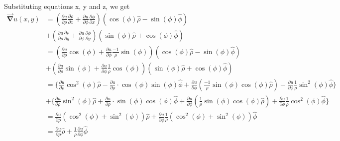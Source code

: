 \documentclass[11pt]{article}
\begin{document}
Substituting equations x, y and z, we get \begin{equation}
\begin{split}
\vec{\mathbf{\nabla}} u(x,y) & = 
\left( \frac {\partial u}{\partial \rho}\frac {\partial \rho}{\partial x} + \frac {\partial u}{\partial \phi}\frac {\partial \phi}{\partial x} \right) \left( \cos(\phi) \hat{\rho} - \sin(\phi) \hat{\phi} \right) \\ & + \left(\frac {\partial u}{\partial \rho}\frac {\partial \rho}{\partial y} + \frac {\partial u}{\partial \phi}\frac {\partial \phi}{\partial y} \right)  \left( \sin(\phi) \hat{\rho} + \cos(\phi) \hat{\phi} \right) 
\\ & =
\left( \frac {\partial u}{\partial \rho} \cos(\phi) + \frac {\partial u}{\partial \phi}\frac {-1}{\rho} \sin(\phi) \right) \left( \cos(\phi) \hat{\rho} - \sin(\phi) \hat{\phi} \right) \\ & + \left(\frac {\partial u}{\partial \rho}\sin(\phi) + \frac {\partial u}{\partial \phi}\frac {1}{\rho} \cos(\phi) \right)  \left( \sin(\phi) \hat{\rho} + \cos(\phi) \hat{\phi} \right)
\\ & = 
\Bigg\{ \frac {\partial u}{\partial \rho} \cos^{2}(\phi)\hat{\rho} - \frac {\partial u}{\partial \rho}\cdot \cos(\phi)\sin(\phi) \hat{\phi}+ \frac{\partial u}{\partial \phi} \left(\frac{-1}{\rho} \sin(\phi) \cos(\phi) \hat{\rho} \right) +  \frac{\partial u}{\partial \phi} \frac{1}{\rho} \sin^{2}(\phi) \hat{\phi} \Bigg\} \\ & + \Bigg\{\frac {\partial u}{\partial \rho}\sin^{2}(\phi)\hat{\rho} + \frac {\partial u}{\partial \rho}\cdot \sin(\phi)\cos(\phi) \hat{\phi} + \frac {\partial u}{\partial \phi}\left( \frac{1}{\rho}\sin(\phi)\cos(\phi)\hat{\rho} \right) + \frac{\partial u}{\partial \phi}\frac{1}{\rho}\cos^{2}(\phi) \hat{\phi} \Bigg\}
\\ & = 
\frac {\partial u}{\partial \rho} \left( \cos^{2}(\phi) + \sin^{2}(\phi) \right) \hat{\rho} + \frac {\partial u}{\partial \phi} \frac{1}{\rho} \left( \cos^{2}(\phi) + \sin^{2}(\phi) \right) \hat{\phi} 
\\ & = 
\frac {\partial u}{\partial \rho} \hat{\rho} + \frac{1}{\rho} \frac {\partial u}{\partial \phi} \hat{\phi} 
\end{split}
\end{equation}
\end{document}
